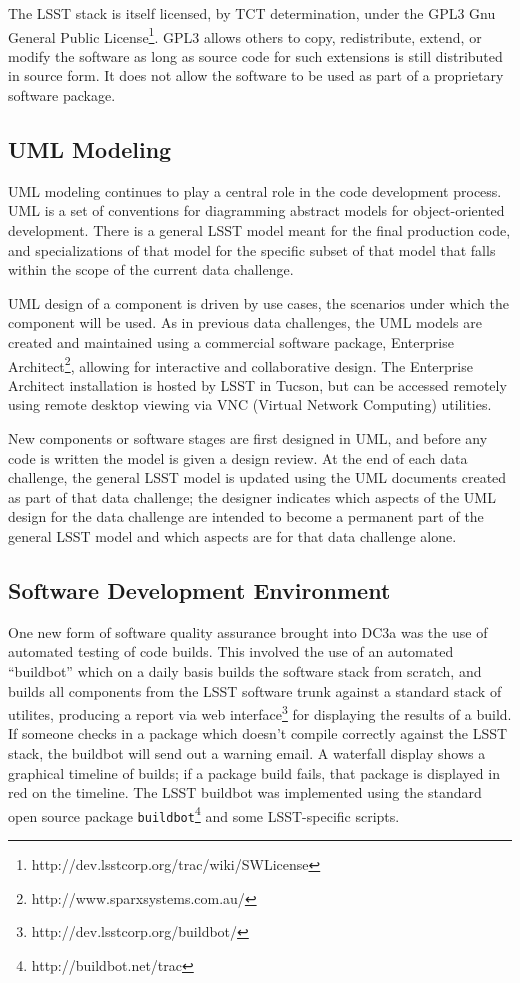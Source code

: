 The LSST stack is itself licensed, by TCT determination, under the GPL3 Gnu
General Public License\footnote{http://dev.lsstcorp.org/trac/wiki/SWLicense}.
GPL3 allows others to copy, redistribute, extend, or modify the software as long
as source code for such extensions is still distributed in source form. It does
not allow the software to be used as part of a proprietary software package.


\subsection{UML Modeling}

UML modeling continues to play a central role in the code development process.
UML is a set of conventions for diagramming abstract models
for object-oriented development. There is a general LSST model meant for the
final production code, and specializations of that model for the specific subset
of that model that falls within the scope of the current data challenge. 

UML design of a component is driven by use cases, the scenarios under which the 
component will be used. As in previous data challenges, the UML models are 
created and maintained using a commercial software package, Enterprise 
Architect\footnote{http://www.sparxsystems.com.au/}, allowing for interactive
and collaborative design. The Enterprise Architect installation is hosted
by LSST in Tucson, but can be accessed remotely using remote desktop viewing
via VNC (Virtual Network Computing) utilities. 

New components or software stages are first designed in UML, and before 
any code is written the model is given a design review. 
At the end of each data challenge, the general LSST model is updated using 
the UML documents created as part of that data challenge; the designer
indicates which aspects of the UML design for the data challenge are intended
to become a permanent part of the general LSST model and which aspects are
for that data challenge alone.


\subsection{Software Development Environment}

One new form of software quality assurance brought into DC3a was the use
of automated testing of code builds. This involved the use of an 
automated ``buildbot'' which on a daily basis builds the software stack 
from scratch, and builds all components from the LSST software trunk against
a standard stack of utilites, producing a report via web 
interface\footnote{http://dev.lsstcorp.org/buildbot/} for displaying the
results of a build. If someone checks in a package which doesn't 
compile correctly against the LSST stack, the buildbot will send out
a warning email. A waterfall display shows a graphical timeline of builds; if a
package build fails, that package is displayed in red on the timeline.
The LSST buildbot was implemented using the standard
open source package \texttt{buildbot}\footnote{http://buildbot.net/trac}
and some LSST-specific scripts.

